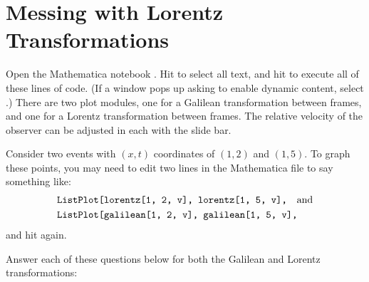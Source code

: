 \section{Messing with Lorentz Transformations}

\makelabheader %

\bigskip

Open the Mathematica notebook .  Hit  to select all text, and
hit  to execute all of these lines of code. (If a window pops up asking to enable
dynamic content, select .)  There are two plot modules, one for a Galilean transformation between frames, and one for a Lorentz transformation between frames.  The relative velocity of the observer can be adjusted in each with the slide bar. 
\medskip


Consider two events with $(x,t)$ coordinates of $(1,2)$ and $(1,5)$.  To graph these points, you may need to edit two lines in the Mathematica file to say something like:
\begin{align*}
&\texttt{ListPlot[{lorentz[1, 2, v], lorentz[1, 5, v]},}~~~ {\rm and} \\
&\texttt{ListPlot[{galilean[1, 2, v], galilean[1, 5, v]},}
\end{align*}
and hit  again.

\bigskip

Answer each of these questions below for both the Galilean and Lorentz transformations:

